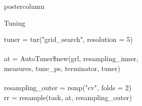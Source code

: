 \documentclass{beamer}
\begin{document}
\begin{frame}[fragile]{}
\begin{columns}
\begin{column}{.245\textwidth}
\begin{beamercolorbox}[center]{postercolumn}
\begin{minipage}{.98\textwidth}
{\begin{myblock}{Tuning}
\begin{codeboxexample}
{                tuner = tnr("grid\_search", resolution = 5)\\
                \ \\
                at = AutoTuner\$new(grl, resampling\_inner,\\
                \hspace*{1ex} measures, tune\_ps, terminator, tuner)\\
                \ \\
                resampling\_outer = rsmp("cv", folds = 2)\\
                rr = resample(task, at, resampling\_outer)}
					    \end{codeboxexample}
            \end{myblock}
						\vfill}
				\end{minipage}
			\end{beamercolorbox}
		\end{column}
	\end{columns}
\end{frame}
\end{document}
